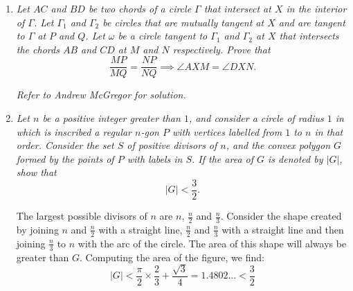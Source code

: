 \documentclass{article}
\begin{document}
\begin{enumerate}
\medskip
\item %
{\itshape Let $AC$ and $BD$ be two chords of a circle $\Gamma$ that intersect at $X$ in the interior of $\Gamma$.
Let $\Gamma_1$ and $\Gamma_2$ be circles that are mutually tangent at $X$ and are tangent to $\Gamma$ at $P$ and $Q$.
Let $\omega$ be a circle tangent to $\Gamma_1$ and $\Gamma_2$ at $X$ that intersects the chords $AB$ and $CD$ at $M$ and $N$ respectively.
Prove that
\[
	\frac{MP}{MQ} = \frac{NP}{NQ} \implies \angle AXM = \angle DXN.
\]}

\textit{Refer to Andrew McGregor for solution.}

\medskip
\item %
{\itshape Let $n$ be a positive integer greater than $1$, and consider a circle of radius $1$ in which is inscribed a regular $n$-gon $P$ with vertices labelled from $1$ to $n$ in that order.
Consider the set $S$ of positive divisors of $n$, and the convex polygon $G$ formed by the points of $P$ with labels in $S$.
If the area of $G$ is denoted by $|G|$, show that
\[ 
	|G| < \frac{3}{2}.
\]}

The largest possible divisors of $n$ are $n$, $\frac{n}{2}$ and $\frac{n}{3}$. Consider the shape created by joining $n$ and $\frac{n}{2}$ with a straight line, $\frac{n}{2}$ and $\frac{n}{3}$ with a straight line and then joining $\frac{n}{3}$ to $n$ with the arc of the circle. The area of this shape will always be greater than $G$. Computing the area of the figure, we find:
$$|G| < \frac{\pi}{2} \times \frac{2}{3} + \frac{\sqrt{3}}{4} = 1.4802... < \frac{3}{2}$$


\end{enumerate}
\end{document}
